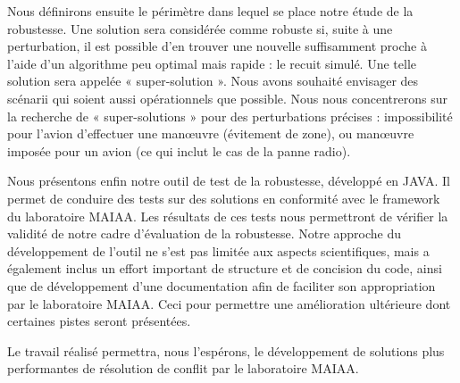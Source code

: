 Nous définirons ensuite le périmètre dans lequel se place notre étude de la robustesse. Une solution sera considérée comme robuste si, suite à une perturbation, il est possible d'en trouver une nouvelle suffisamment proche à l'aide d'un algorithme peu optimal mais rapide : le recuit simulé. Une telle solution sera appelée « super-solution ». Nous avons souhaité envisager des scénarii qui soient aussi opérationnels que possible. Nous nous concentrerons sur la recherche de « super-solutions » pour des perturbations précises : impossibilité pour l'avion d'effectuer une manœuvre (évitement de zone), ou manœuvre imposée pour un avion (ce qui inclut le cas de la panne radio).

Nous présentons enfin notre outil de test de la robustesse, développé en JAVA. Il permet de conduire des tests sur des solutions en conformité avec le framework du laboratoire MAIAA. Les résultats de ces tests nous permettront de vérifier la validité de notre cadre d'évaluation de la robustesse. Notre approche du développement de l'outil ne s'est pas limitée aux aspects scientifiques, mais a également inclus un effort important de structure et de concision du code, ainsi que de développement d'une documentation afin de faciliter son appropriation par le laboratoire MAIAA.  Ceci pour permettre une amélioration ultérieure dont certaines pistes seront présentées. 

Le travail réalisé permettra, nous l'espérons, le développement de solutions plus performantes de résolution de conflit par le laboratoire MAIAA.

\thispagestyle{plain}